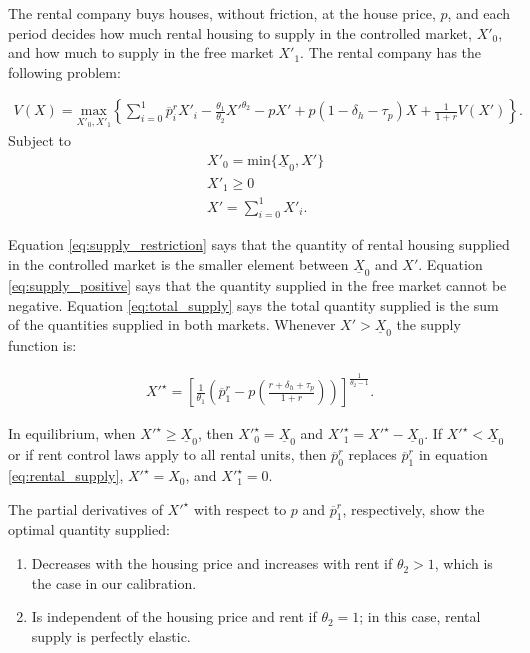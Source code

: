 \documentclass[parskip=full]{article}
\begin{document}
The rental company buys houses, without friction, at the house price, $p$, and each period decides how much rental housing to supply in the controlled market, $X'_{0}$, and how much to supply in the free market $X'_{1}$. The rental company has the following problem:

\begin{align}\label{eq:rental_company_problem}
V(X)=\underset{X'_{0},X'_{1}} {\text{$\mbox{max} $}}\left\{\sum_{i=0}^{1} \overline{p}^{r}_{i}X'_{i}-\frac{\theta_{1}}{\theta_{2}}X'^{\theta_{2}}-p X'+p(1-\delta_{h}-\tau_{p})X+\frac{1}{1+r}V(X')\right\}.
\end{align}
Subject to
\begin{align}
& X'_{0}=\mbox{min}\{\underline{X}_{0},X'\} \label{eq:supply_restriction} \\
& X'_{1} \geq 0 \label{eq:supply_positive} \\
& X'=\sum^{1}_{i=0} X'_{i}. \label{eq:total_supply} 
\end{align}

\noindent Equation \ref{eq:supply_restriction} says that the quantity of rental housing supplied in the controlled market is the smaller element between $\underline{X}_{0}$ and $X'$. Equation \ref{eq:supply_positive} says that the quantity supplied in the free market cannot be negative. Equation \ref{eq:total_supply} says the total quantity supplied is the sum of the quantities supplied in both markets. Whenever $X'>\underline{X}_{0}$ the supply function is:

\begin{align}\label{eq:rental_supply}
X'^{\star}=\left[\frac{1}{\theta_{1}}\left(\overline{p}^{r}_{1}-p\left(\frac{r+\delta_{h}+\tau_{p}}{1+r}\right)\right)\right]^{\frac{1}{\theta_{2}-1}}.
\end{align}

\noindent In equilibrium, when $X'^{\star}\geq \underline{X}_{0}$, then $X'^{\star}_{0}=\underline{X}_{0}$ and $X'^{\star}_{1}=X'^{\star}-\underline{X}_{0}$. If $X'^{\star}<\underline{X}_{0}$ or if rent control laws apply to all rental units, then $\overline{p}^{r}_{0}$ replaces $\overline{p}^{r}_{1}$ in equation \ref{eq:rental_supply}, $X'^{\star}=X_{0}$, and $X'^{\star}_{1}=0$. 

\noindent The partial derivatives of $X'^{\star}$ with respect to $p$ and $\overline{p}^{r}_{1}$, respectively, show the optimal quantity supplied:

\begin{enumerate}
    \item Decreases with the housing price and increases with rent if $\theta_{2}>1$, which is the case in our calibration.
    \item Is independent of the housing price and rent if $\theta_{2}=1$; in this case, rental supply is perfectly elastic.
\end{enumerate}
\end{document}
